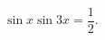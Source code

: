 \begin{ex}[type=equation]
	\begin{condition}
		$\ \sin x\sin 3x =\dfrac{1}{2}. $
	\end{condition}
\end{ex}